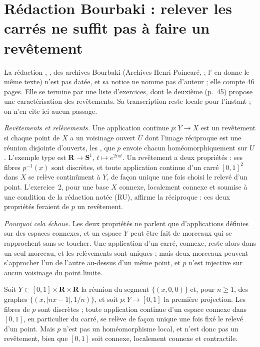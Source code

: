 \section[Rédaction Bourbaki \redac{205} : un critère de revêtement]{Rédaction Bourbaki  : relever les carrés ne suffit pas à faire un revêtement\protect{}}\label{sec:bourbaki-205}

La rédaction , , des archives Bourbaki (Archives Henri Poincaré,  ; l' en donne le même texte) n'est pas datée, et sa notice ne nomme pas d'auteur ; elle compte 46 pages. Elle se termine par une liste d'exercices, dont le deuxième (p.~45) propose une caractérisation des revêtements. Sa transcription reste locale pour l'instant ; on n'en cite ici aucun passage.

\emph{Revêtements et relèvements.} Une application continue $p : Y \to X$ est un revêtement si chaque point de $X$ a un voisinage ouvert $U$ dont l'image réciproque est une réunion disjointe d'ouverts, les , que $p$ envoie chacun homéomorphiquement sur $U$. L'exemple type est $\mathbf R \to \mathbf S^1$, $t \mapsto e^{2i\pi t}$. Un revêtement a deux propriétés : ses fibres $p^{-1}(x)$ sont discrètes, et toute application continue d'un carré $[0, 1]^2$ dans $X$ se relève continûment à $Y$, de façon unique une fois choisi le relevé d'un point. L'exercice~2, pour une base $X$ connexe, localement connexe et soumise à une condition de la rédaction notée (RU), affirme la réciproque : ces deux propriétés feraient de $p$ un revêtement.

\emph{Pourquoi cela échoue.} Les deux propriétés ne parlent que d'applications définies sur des espaces connexes, et un espace $Y$ peut être fait de morceaux qui se rapprochent sans se toucher. Une application d'un carré, connexe, reste alors dans un seul morceau, et les relèvements sont uniques ; mais deux morceaux peuvent s'approcher l'un de l'autre au-dessus d'un même point, et $p$ n'est injective sur aucun voisinage du point limite.

\begin{encadre}
\begin{contrexemple}
Soit $Y \subset [0, 1] \times \mathbf R \times \mathbf R$ la réunion du segment $\{(x, 0, 0)\}$ et, pour $n \geq 1$, des graphes $\{(x, |nx - 1|, 1/n)\}$, et soit $p : Y \to [0, 1]$ la première projection. Les fibres de $p$ sont discrètes ; toute application continue d'un espace connexe dans $[0, 1]$, en particulier du carré, se relève de façon unique une fois fixé le relevé d'un point. Mais $p$ n'est pas un homéomorphisme local, et n'est donc pas un revêtement, bien que $[0, 1]$ soit connexe, localement connexe et contractile.
\end{contrexemple}
\end{encadre}

